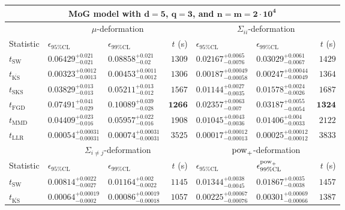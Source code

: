 \begin{tabular}{l|llr|llr}
	\toprule
	\multicolumn{7}{c}{{\bf MoG model with $\mathbf{d=5}$, $\mathbf{q=3}$, and $\mathbf{n=m=2\cdot 10^{4}}$}} \\
	\toprule
	\multicolumn{1}{c}{} & \multicolumn{3}{c}{$\mu$-deformation} & \multicolumn{3}{c}{$\Sigma_{ii}$-deformation} \\
	Statistic & $\epsilon_{95\%\mathrm{CL}}$ & $\epsilon_{99\%\mathrm    {CL}}$ & $t$ (s) & $\epsilon_{95\%\mathrm{CL}}$ & $\epsilon_{99\%\mathrm{CL}}$ & $t$ (s) \\
	\midrule
	$t_{\mathrm{SW}}$ & $0.06429_{-0.021}^{+0.021}$ & $0.08858_{-0.02}^{+0.021}$ & $1309$ & $0.02167_{-0.0076}^{+0.0065}$ & $0.03029_{-0.0067}^{+0.0061}$ & $1429$ \\
	$t_{\overline{\mathrm{KS}}}$ & ${\mathbf{0.00323_{-0.0013}^{+0.0012}}}$ & ${\mathbf{0.00453_{-0.0012}^{+0.0011}}}$ & $1306$ & ${\mathbf{0.00187_{-0.00058}^{+0.00049}}}$ & ${\mathbf{0.00247_{-0.00049}^{+0.00044}}}$ & $1364$ \\
	$t_{\mathrm{SKS}}$ & $0.03829_{-0.013}^{+0.013}$ & $0.05211_{-0.012}^{+0.013}$ & $1567$ & $0.01144_{-0.0035}^{+0.0027}$ & $0.01578_{-0.0026}^{+0.0024}$ & $1687$ \\
	$t_{\mathrm{FGD}}$ & $0.07491_{-0.029}^{+0.041}$ & $0.10089_{-0.028}^{+0.039}$ & ${\mathbf{1266}}$ & $0.02357_{-0.007}^{+0.0063}$ & $0.03187_{-0.0054}^{+0.0055}$ & ${\mathbf{1324}}$ \\
	$t_{\mathrm{MMD}}$ & $0.04409_{-0.016}^{+0.023}$ & $0.05957_{-0.016}^{+0.022}$ & $1908$ & $0.01045_{-0.0036}^{+0.0043}$ & $0.01406_{-0.0033}^{+0.004}$ & $2122$ \\
	$t_{\mathrm{LLR}}$ & $0.00054_{-0.00031}^{+0.00031}$ & $0.00074_{-0.00031}^{+0.00031}$ & $3525$ & $0.00017_{-0.00013}^{+0.00012}$ & $0.00025_{-0.00012}^{+0.00012}$ & $3833$ \\
	\toprule
	\multicolumn{1}{c}{} & \multicolumn{3}{c}{$\Sigma_{i\neq j}$-deformation} & \multicolumn{3}{c}{$\rm{pow}_{+}$-deformation} \\
	Statistic & $\epsilon_{95\%\mathrm{CL}}$ & $\epsilon_{99\%\mathrm{CL}}$ & $t$ (s) & $\epsilon_{95\%\mathrm{CL}}$ & $\epsilon^{\rm   {pow}_{+}}_{99\%\mathrm{CL}}$ & $t$ (s) \\
	\midrule
	$t_{\mathrm{SW}}$ & $0.00814_{-0.0027}^{+0.0022}$ & $0.01164_{-0.0022}^{+0.002}$ & $1145$ & $0.01344_{-0.0045}^{+0.0038}$ & $0.01867_{-0.0038}^{+0.0035}$ & $1457$ \\
	$t_{\overline{\mathrm{KS}}}$ & ${\mathbf{0.00064_{-0.0002}^{+0.00019}}}$ & ${\mathbf{0.00086_{-0.00018}^{+0.00019}}}$ & $1057$ & ${\mathbf{0.00225_{-0.00076}^{+0.00067}}}$ & ${\mathbf{0.00301_{-0.00066}^{+0.00069}}}$ & $1387$ \\

\end{tabular}
